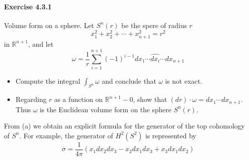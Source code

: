 \documentclass{article}
\begin{document}
\paragraph{Exercise 4.3.1}Volume form on a sphere. Let  $ S^n(r)  $ be the spere of radius  $ r  $
\[x_1^2+x_2^2+\cdots+x_{n+1}^2=r^2\]
in  $ \mathbb{R}^{n+1} $, and let 
\[\omega =\frac{1 }{r }\sum\limits_{i=1}^{n+1}(-1)^{i-1}dx_1\cdots \widehat{dx_i}\cdots dx_{n+1}  \]
\begin{itemize}
    \item Compute the integral  $ \int_{S^n}\omega $ and conclude that  $ \omega $ is not exact.
    \item Regarding  $ r  $ as a function on  $ \mathbb{R}^{n+1}-{0} $, show that  $ (dr)\cdot \omega=dx_1\cdots dx_{n+1} $. Thus  $ \omega  $ is the Euclidean volume form on the sphere  $ S^n(r) $.  
\end{itemize} 
From  (a) we obtain an explicit formula for the generator of the top cohomology of  $ S^n $. For example, the generator of  $ H^2(S^2) $ is represented by 
\[\sigma=\frac{1 }{4\pi }(x_1dx_2dx_3-x_2dx_1dx_3+x_3dx_1dx_2)\] 
\end{document}
